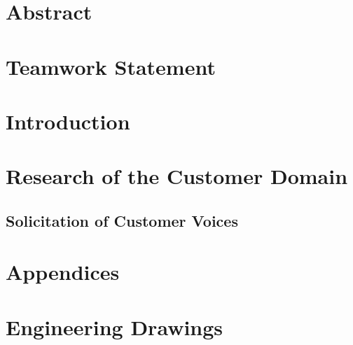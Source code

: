 \documentclass[12pt]{report}
\begin{document}
    \chapter*{Abstract}
        
        \clearpage
    
    
    \chapter*{Teamwork Statement}
        
        \clearpage
    
    
    \tableofcontents
    \clearpage
    \listoffigures
    \clearpage
    \listoftables
    \clearpage
    
    
    \chapter{Introduction}
        
    
    \chapter{Research of the Customer Domain}
    
    
    \section{Solicitation of Customer Voices}
     

    \clearpage
    \printbibliography[heading=bibintoc, title={References}]
    \clearpage
    
    \appendix
    \chapter{Appendices}
    \label{sec:A-calculation_appendix}
    
    
    \chapter{Engineering Drawings}
    

    
    \clearpage
\end{document}
